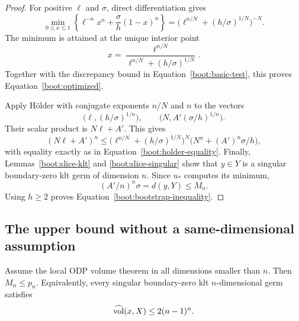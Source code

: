 \begin{proof}
For positive $\ell$ and $\sigma$, direct differentiation gives
\[
 \min_{0\leq x\leq1}
 \left\{\ell^{-n}x^n+\frac{\sigma}{h}(1-x)^n\right\}
 =\bigl(\ell^{n/N}+(h/\sigma)^{1/N}\bigr)^{-N}.
\]
The minimum is attained at the unique interior point
\begin{equation}
 \label{boot:optimal-split}
 x=\frac{\ell^{n/N}}
         {\ell^{n/N}+(h/\sigma)^{1/N}}.
\end{equation}
Together with the discrepancy bound in
Equation~\eqref{boot:basic-test}, this proves
Equation~\eqref{boot:optimized}.

Apply Hölder with conjugate exponents $n/N$ and $n$ to the
vectors
\[
 \bigl(\ell,(h/\sigma)^{1/n}\bigr),
 \qquad
 \bigl(N,A'(\sigma/h)^{1/n}\bigr).
\]
Their scalar product is $N\ell+A'$.  This gives
\[
 (N\ell+A')^n
 \leq
 \bigl(\ell^{n/N}+(h/\sigma)^{1/N}\bigr)^N
 \bigl(N^n+(A')^n\sigma/h\bigr),
\]
with equality exactly as in
Equation~\eqref{boot:holder-equality}.
Finally, Lemmas~\ref{boot:slice-klt} and
\ref{boot:slice-singular} show that $y\in Y$ is a singular
boundary-zero klt germ of dimension $n$.  Since $u_*$ computes
its minimum,
\[
 (A'/n)^n\sigma=d(y,Y)\leq M_n.
\]
Using $h\geq2$ proves Equation~\eqref{boot:bootstrap-inequality}.
\end{proof}

\subsection{The upper bound without a same-dimensional assumption}

\begin{theorem}
\label{boot:upper}
Assume the local ODP volume theorem in all dimensions smaller
than $n$.  Then $M_n\leq p_n$.  Equivalently, every singular
boundary-zero klt $n$-dimensional germ satisfies
\[
 \widehat{\operatorname{vol}}(x,X)\leq 2(n-1)^n.
\]
\end{theorem}

